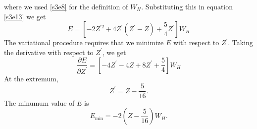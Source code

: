 \documentclass{article}
\numberwithin{equation}{section}
\begin{document}
where we used \eqref{s3e8} for the definition of $W_H$. Substituting this in
equation \eqref{s3e13} we get
\begin{equation}\label{s3e19}
E = \left[-2Z^{\prime 2} + 4Z^\prime(Z^\prime - Z) + \frac{5}{4}Z^\prime\right]W_H
\end{equation}
The variational procedure requires that we minimize $E$ with respect to $Z^\prime$.
Taking the derivative with respect to $Z^\prime$, we get
\[
\frac{\partial E}{\partial Z^\prime} = \left[-4Z^\prime - 4Z + 8Z^\prime + \frac{5}{4}\right]W_H
\]
At the extremum,
\begin{equation}\label{s3e20}
Z^\prime = Z - \frac{5}{16}.
\end{equation}
The minumum value of $E$ is
\begin{equation}\label{s3e21}
E_{\text{min}} = -2\left(Z - \frac{5}{16}\right)W_H.
\end{equation}
\end{document}
